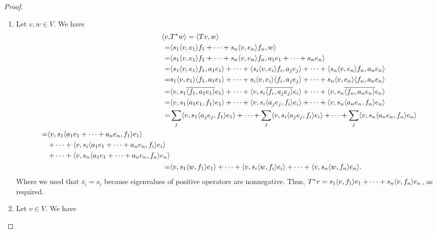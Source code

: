 \begin{proof}
 \begin{enumerate}
     \item Let $v,w\in V$. We have 
     \begin{align*}
         \langle v,&T^\ast w\rangle 
         = \langle Tv, w\rangle\\
         =& \langle s_1\langle v,e_1\rangle f_1+\dots+s_n\langle v,e_n\rangle f_n, w\rangle\\
         =& \langle s_1\langle v,e_1\rangle f_1+\dots+s_n\langle v,e_n\rangle f_n, a_1e_1+\dots+a_ne_n\rangle\\
         =& \langle s_1\langle v,e_1\rangle f_1, a_1e_1\rangle
         +\dots+\langle s_i\langle v,e_i\rangle f_i, a_je_j\rangle
         +\dots+\langle s_n\langle v,e_n\rangle f_n, a_ne_n\rangle\\
         =& s_1\langle v,e_1\rangle\langle f_1, a_1e_1\rangle
         +\dots+s_i\langle v,e_i\rangle\langle f_i, a_je_j\rangle
         +\dots+s_n\langle v,e_n\rangle\langle f_n, a_ne_n\rangle\\
         =& \langle v,s_1\overline{\langle f_1, a_1e_1\rangle}e_1\rangle
         +\dots+\langle v,s_i\overline{\langle f_i, a_je_j\rangle}e_i\rangle
         +\dots+\langle v,s_n\overline{\langle f_n, a_ne_n\rangle}e_n\rangle\\
         =& \langle v,s_1\langle a_1e_1, f_1\rangle e_1\rangle
         +\dots+\langle v,s_i\langle a_je_j, f_i\rangle e_i\rangle
         +\dots+\langle v,s_n\langle a_ne_n, f_n\rangle e_n\rangle\\
         =& \sum_j\langle v,s_1\langle a_je_j, f_1\rangle e_1\rangle
         +\dots+\sum_j\langle v,s_i\langle a_je_j, f_i\rangle e_i\rangle
         +\dots+\sum_j\langle v,s_n\langle a_ne_n, f_n\rangle e_n\rangle\\
         \begin{split}
         =& \langle v,s_1\langle a_1e_1+\dots+a_ne_n, f_1\rangle e_1\rangle\\
         &+\dots+\langle v,s_i\langle a_1e_1+\dots+a_ne_n, f_i\rangle e_i\rangle\\
         &+\dots+\langle v,s_n\langle a_1e_1+\dots+a_ne_n, f_n\rangle e_n\rangle
         \end{split}\\
         =& \langle v,s_1\langle w, f_1\rangle e_1\rangle
         +\dots+\langle v,s_i\langle w, f_i\rangle e_i\rangle
         +\dots+\langle v,s_n\langle w, f_n\rangle e_n\rangle.
     \end{align*}
     Where we used that $\bar{s_i}=s_i$ because eigenvalues of positive operators are nonnegative. Thus, $T^\ast v =s_1\langle v,f_1\rangle e_1+\dots+s_n\langle v,f_n\rangle e_n$, as required.
     \item Let $v\in V$. We have

\end{enumerate}
\end{proof}
